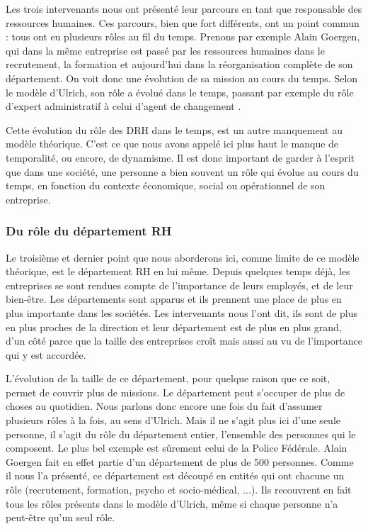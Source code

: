 Les trois intervenants nous ont présenté leur parcours en tant que responsable des ressources humaines. Ces parcours, bien que fort différents, ont un point commun : tous ont eu plusieurs rôles au fil du temps. Prenons par exemple Alain Goergen, qui dans la même entreprise est passé par les ressources humaines dans le recrutement, la formation et aujourd'hui dans la réorganisation complète de son département. On voit donc une évolution de sa mission au cours du temps. Selon le modèle d'Ulrich, son rôle a évolué dans le temps, passant par exemple du rôle d'\og{}expert administratif\fg{} à celui d'\og{}agent de changement \fg{}. \newline 

Cette évolution du rôle des DRH dans le temps, est un autre manquement au modèle théorique. C'est ce que nous avons appelé ici plus haut le manque de temporalité, ou encore, de dynamisme. Il est donc important de garder à l'esprit que dans une société, une personne a bien souvent un rôle qui évolue au cours du temps, en fonction du contexte économique, social ou opérationnel de son entreprise. \\ 


\subsubsection{Du rôle du département RH}

Le troisième et dernier point que nous aborderons ici, comme limite de ce modèle théorique, est le département RH en lui même. Depuis quelques temps déjà, les entreprises se sont rendues compte de l'importance de leurs employés, et de leur bien-être. Les départements sont apparus et ils prennent une place de plus en plus importante dans les sociétés. Les intervenants nous l'ont dit, ils sont de plus en plus proches de la direction et leur département est de plus en plus grand, d'un côté parce que la taille des entreprises croît mais aussi au vu de l'importance qui y est accordée. \newline
{}

L'évolution de la taille de ce département, pour quelque raison que ce soit, permet de couvrir plus de missions. Le département peut s'occuper de plus de choses au quotidien. Nous parlons donc encore une fois du fait d'assumer plusieurs rôles à la fois, au sens d'Ulrich. Mais il ne s'agit plus ici d'une seule personne, il s'agit du rôle du département entier, l'ensemble des personnes qui le composent. Le plus bel exemple est sûrement celui de la Police Fédérale. Alain Goergen fait en effet partie d'un département de plus de 500 personnes. Comme il nous l'a présenté, ce département est découpé en entités qui ont chacune un rôle (recrutement, formation, psycho et socio-médical, ...). Ils recouvrent en fait tous les rôles présents dans le modèle d'Ulrich, même si chaque personne n'a peut-être qu'un seul rôle. \newline

